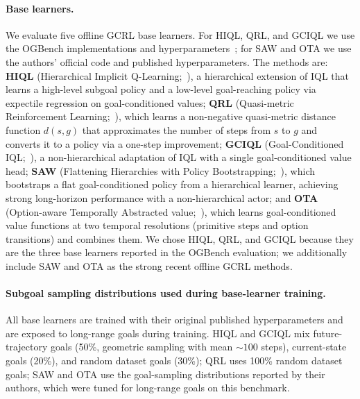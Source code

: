 \documentclass{article} %
\begin{document}
\paragraph{Base learners.} We evaluate five offline GCRL base learners. For HIQL, QRL, and GCIQL we use the OGBench implementations and hyperparameters~\citep{ogbench_park2025}; for SAW and OTA we use the authors' official code and published hyperparameters. The methods are: \textbf{HIQL} (Hierarchical Implicit Q-Learning;~\citealp{park2024hiqlofflinegoalconditionedrl}), a hierarchical extension of IQL that learns a high-level subgoal policy and a low-level goal-reaching policy via expectile regression on goal-conditioned values; \textbf{QRL} (Quasi-metric Reinforcement Learning;~\citealp{tongzhouw2023qrl}), which learns a non-negative quasi-metric distance function $d(s,g)$ that approximates the number of steps from $s$ to $g$ and converts it to a policy via a one-step improvement; \textbf{GCIQL} (Goal-Conditioned IQL;~\citealp{Kostrikov2022}), a non-hierarchical adaptation of IQL with a single goal-conditioned value head; \textbf{SAW} (Flattening Hierarchies with Policy Bootstrapping;~\citealp{zhou2025flattening}), which bootstraps a flat goal-conditioned policy from a hierarchical learner, achieving strong long-horizon performance with a non-hierarchical actor; and \textbf{OTA} (Option-aware Temporally Abstracted value;~\citealp{ota2025}), which learns goal-conditioned value functions at two temporal resolutions (primitive steps and option transitions) and combines them. We chose HIQL, QRL, and GCIQL because they are the three base learners reported in the OGBench evaluation; we additionally include SAW and OTA as the strong recent offline GCRL methods.

\paragraph{Subgoal sampling distributions used during base-learner training.} All base learners are trained with their original published hyperparameters and are exposed to long-range goals during training. HIQL and GCIQL mix future-trajectory goals (50\%, geometric sampling with mean ${\sim}100$ steps), current-state goals (20\%), and random dataset goals (30\%); QRL uses 100\% random dataset goals; SAW and OTA use the goal-sampling distributions reported by their authors, which were tuned for long-range goals on this benchmark.
\end{document}
